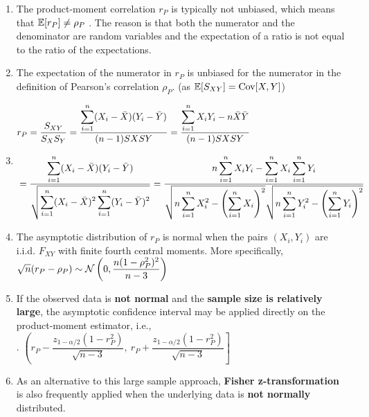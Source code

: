\begin{enumerate}
    \item The product-moment correlation $r_P$ is typically not unbiased, which means that $\mathbb{E}[r_P] \neq \rho_P$ .
    The reason is that both the numerator and the denominator are random variables and the expectation of a ratio is not equal to the ratio of the expectations.
    \hfill \cite{statistics/book/Statistics-for-Data-Scientists/Maurits-Kaptein}

    \item The expectation of the numerator in $r_P$ is unbiased for the numerator in the definition of Pearson’s correlation $\rho_P$. (as $\mathbb{E}[S_{X Y}] = \text{Cov}[X, Y]$)
    \hfill \cite{statistics/book/Statistics-for-Data-Scientists/Maurits-Kaptein}

    \item
    $
        \begin{aligned}
            &r_P
            = \dfrac{S_{X Y} }{S_X S_Y}
            = \dfrac{\displaystyle\sum^n_{i=1} (X_i - \bar{X} )(Y_i - \bar{Y} )}{(n - 1)S X SY}
            = \dfrac{\displaystyle\sum^n_{i=1} X_i Y_i - n \bar{X} \bar{Y}}{(n - 1)S X SY} \\[0.3cm]
            &= \dfrac{\displaystyle\sum^n_{i=1} (X_i - \bar{X})(Y_i - \bar{Y} )}{\sqrt{\displaystyle\sum^n_{i=1} (X_i - \bar{X} )^2 \displaystyle\sum^n_{i=1} (Y_i - \bar{Y} )^2}}
            = \dfrac{n \displaystyle\sum^n_{i=1} X_i Y_i - \displaystyle\sum^n_{i=1} X_i \displaystyle\sum^n_{i=1} Y_i}{\sqrt{n \displaystyle\sum^n_{i=1} X^2_i - \left(\displaystyle\sum^n_{i=1} X_i\right)^2} \sqrt{n \displaystyle\sum^n_{i=1} Y^2_i - \left(\displaystyle\sum^n_{i=1} Y_i\right)^2}}
        \end{aligned}
    $
    \hfill \cite{statistics/book/Statistics-for-Data-Scientists/Maurits-Kaptein}

    \item The asymptotic distribution of $r_P$ is normal when the pairs $(X_i , Y_i )$ are i.i.d. $F_{ X Y}$ with finite fourth central moments.
    More specifically, $\sqrt{n}(r_P - \rho_P ) \sim \mathcal{N}\left(0, \dfrac{n(1 - \rho^2_P )^2}{n - 3}\right) $
    \hfill \cite{statistics/book/Statistics-for-Data-Scientists/Maurits-Kaptein}

    \item If the observed data is \textbf{not normal} and the \textbf{sample size is relatively large}, the asymptotic confidence interval may be applied directly on the product-moment estimator, i.e.,
    \hfill \cite{statistics/book/Statistics-for-Data-Scientists/Maurits-Kaptein}
    \\[0.3cm]
    .\hfill
    $
        \left(
            r_P - \dfrac{z_{1-\alpha/2}(1 - r^2_P )}{\sqrt{n-3}},
            \ r_P + \dfrac{z_{1-\alpha/2}(1 - r^2_P )}{\sqrt{n-3}}
        \right]
    $
    \hfill \cite{statistics/book/Statistics-for-Data-Scientists/Maurits-Kaptein}

    \item As an alternative to this large sample approach, \textbf{Fisher z-transformation} is also frequently applied when the underlying data is \textbf{not normally} distributed.
    \hfill \cite{statistics/book/Statistics-for-Data-Scientists/Maurits-Kaptein}
\end{enumerate}






